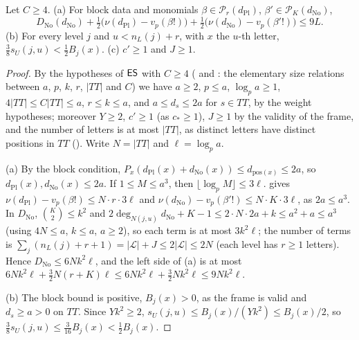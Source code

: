 \begin{lemma}[Sizes]\label{pf:linkG:sizes}
Let $C\ge4$. (a) For block data and monomials $\beta\in\mathcal P_r(d_{\mathrm{Pl}})$, $\beta'\in\mathcal P_K(d_{\mathrm{No}})$,
\[
D_{\mathrm{No}}(d_{\mathrm{No}})+\tfrac12\bigl(\nu(d_{\mathrm{Pl}})-v_p(\beta!)\bigr)+\tfrac12\bigl(\nu(d_{\mathrm{No}})-v_p(\beta'!)\bigr)\le9L .
\]
(b) For every level $j$ and $u<n_L(j)+r$, with $x$ the $u$-th letter, $\frac38s_U(j,u)<\frac12B_j(x)$. (c) $c'\ge1$ and $J\ge1$.
\end{lemma}

\begin{proof}
By the hypotheses of $\mathsf{ES}$ with $C\ge4$ ( and :
the elementary size relations between $a$, $p$, $k$, $r$, $|TT|$ and $C$) we have $a\ge2$, $p\le a$, $\log_pa\ge1$,
$4|TT|\le C|TT|\le a$, $r\le k\le a$, and $a\le d_s\le2a$ for $s\in TT$, by the weight hypotheses; moreover $Y\ge2$, $c'\ge1$ (as
$c_*\ge1$), $J\ge1$ by the validity of the frame, and the number of letters is at most $|TT|$, as distinct letters have distinct
positions in $TT$ ().
Write $N=|TT|$ and $\ell=\log_pa$.

(a) By the block condition, $P_x(d_{\mathrm{Pl}}(x)+d_{\mathrm{No}}(x))\le d_{\mathrm{pos}(x)}\le2a$, so $d_{\mathrm{Pl}}(x),d_{\mathrm{No}}(x)\le2a$. If
$1\le M\le a^3$, then $\lfloor\log_pM\rfloor\le3\ell$.  gives
$\nu(d_{\mathrm{Pl}})-v_p(\beta!)\le N\cdot r\cdot3\ell$ and $\nu(d_{\mathrm{No}})-v_p(\beta'!)\le N\cdot K\cdot3\ell$, as $2a\le a^3$. In
$D_{\mathrm{No}}$, $\binom K2\le k^2$ and $2\deg_{N(j,u)}d_{\mathrm{No}}+K-1\le2\cdot N\cdot2a+k\le a^2+a\le a^3$ (using $4N\le a$, $k\le a$,
$a\ge2$), so each term is at most $3k^2\ell$; the number of terms is $\sum_j(n_L(j)+r+1)=|\mathcal L|+J\le2|\mathcal L|\le2N$ (each
level has $r\ge1$ letters). Hence $D_{\mathrm{No}}\le6Nk^2\ell$, and the left side of (a) is at most
$6Nk^2\ell+\frac32N(r+K)\ell\le6Nk^2\ell+\frac32Nk^2\ell\le9Nk^2\ell$.

(b) The block bound is positive, $B_j(x)>0$, as the frame is valid and $d_s\ge a>0$ on $TT$. Since $Yk^2\ge2$,
$s_U(j,u)\le B_j(x)/(Yk^2)\le B_j(x)/2$, so $\frac38s_U(j,u)\le\frac3{16}B_j(x)<\frac12B_j(x)$.
\end{proof}

